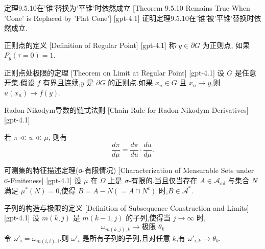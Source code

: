 \documentclass[UTF8]{ctexart}
\begin{document}
    
    
    \begin{thm}
        {定理9.5.10在'锥'替换为'平锥'时依然成立}
        [Theorem 9.5.10 Remains True When 'Cone' is Replaced by 'Flat Cone']
        [gpt-4.1]
        证明定理9.5.10在'锥'被'平锥'替换时依然成立.
    \end{thm}
    
    
    
    \begin{dfn}
        {正则点的定义}
        [Definition of Regular Point]
        [gpt-4.1]
        称 $y \in \partial G$ 为正则点, 如果 $P_y(\tau = 0) = 1$.
    \end{dfn}
    
    
    
    \begin{thm}
        {正则点处极限的定理}
        [Theorem on Limit at Regular Point]
        [gpt-4.1]
        设 $G$ 是任意开集.假设 $f$ 有界且连续,$y$ 是 $\partial G$ 的正则点.如果 $x_n \in G$ 且 $x_n \to y$,则 $
u(x_n) \to f(y)$.
    \end{thm}
    
    
    
    \begin{ppt}
        {Radon-Nikodym导数的链式法则}
        [Chain Rule for Radon-Nikodym Derivatives]
        [gpt-4.1]
        
若 $\pi \ll 
u \ll \mu$, 则有
\[
\frac{d\pi}{d\mu} = \frac{d\pi}{d
u} \cdot \frac{d
u}{d\mu}.
\]

    \end{ppt}
    
    
    
    \begin{thm}
        {可测集的特征描述定理(σ-有限情况)}
        [Characterization of Measurable Sets under σ-Finiteness]
        [gpt-4.1]
        设 $\mu$ 在 $\Omega$ 上是 $\sigma$-有限的.当且仅当存在 $A \in \mathcal{A}_{\sigma\delta}$ 与集合 $N$ 满足 $\mu^*(N) = 0$,使得 $B = A - N (= A \cap N^c)$ 时,$B \in \mathcal{A}^*$.
    \end{thm}
    
    
    
    \begin{dfn}
        {子列的构造与极限的定义}
        [Definition of Subsequence Construction and Limits]
        [gpt-4.1]
        设 $m(k, j)$ 是 $m(k - 1, j)$ 的子列,使得当 $j \to \infty$ 时,
\[
\omega_{m(k, j), k} \to \text{极限 } \theta_k
\]
令 $\omega'_i = \omega_{m(i, i), i}$.则 $\omega'_i$ 是所有子列的子列,且对任意 $k$,有 $\omega'_{i, k} \to \theta_k$.
    \end{dfn}
    
\end{document}
